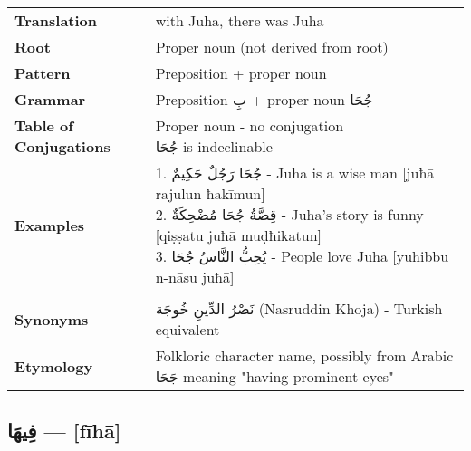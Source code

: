 \documentclass[letter,12pt]{article}
\begin{document}
\begin{tabular}{p{3cm}p{10cm}}
\toprule
\textbf{Translation} & with Juha, there was Juha \\
\textbf{Root} & Proper noun (not derived from root) \\
\textbf{Pattern} & Preposition + proper noun \\
\textbf{Grammar} & Preposition \textarabic{بِ} + proper noun \textarabic{جُحَا} \\
\textbf{Table of Conjugations} & \makecell[l]{
Proper noun - no conjugation\\
\textarabic{جُحَا} is indeclinable
} \\
\textbf{Examples} & \makecell[l]{\parbox{9.5cm}{
1. \textarabic{جُحَا رَجُلٌ حَكِيمٌ} - Juha is a wise man [juħā rajulun ħakīmun]\\
2. \textarabic{قِصَّةُ جُحَا مُضْحِكَةٌ} - Juha's story is funny [qiṣṣatu juħā muḍħikatun]\\
3. \textarabic{يُحِبُّ النَّاسُ جُحَا} - People love Juha [yuħibbu n-nāsu juħā]
}} \\
\midrule \\
\textbf{Synonyms} & \textarabic{نَصْرُ الدِّينِ خُوجَة} (Nasruddin Khoja) - Turkish equivalent \\
\textbf{Etymology} & Folkloric character name, possibly from Arabic \textarabic{جَحَا} meaning "having prominent eyes" \\
\bottomrule
\end{tabular}

\subsection{\textarabic{فِيهَا} — [fīhā]}
\end{document}
